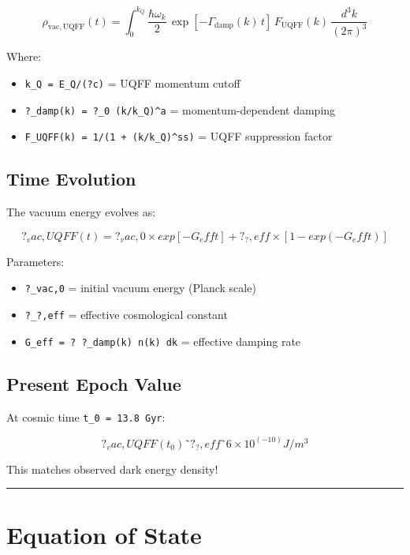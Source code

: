 \documentclass[12pt,a4paper]{article}
\begin{document}
\begin{equation}
\rho_{\mathrm{vac,UQFF}}(t) = \int_0^{k_Q} \frac{\hbar\omega_k}{2}\,\exp\!\left[-\Gamma_{\mathrm{damp}}(k)\,t\right]\,F_{\mathrm{UQFF}}(k)\,\frac{d^3k}{(2\pi)^3}
\end{equation}

Where:

\begin{itemize}
  \item \texttt{k\_Q = E\_Q/(?c)} = UQFF momentum cutoff
  \item \texttt{?\_damp(k) = ?\_0 (k/k\_Q)\^{}a} = momentum-dependent damping
  \item \texttt{F\_UQFF(k) = 1/(1 + (k/k\_Q)\^{}ss)} = UQFF suppression factor
\end{itemize}

\subsection{Time Evolution}

The vacuum energy evolves as:

\begin{equation}
?_vac,UQFF(t) = ?_vac,0 \times exp[-G_eff t] + ?_?,eff \times [1 - exp(-G_eff t)]
\end{equation}

Parameters:

\begin{itemize}
  \item \texttt{?\_vac,0} = initial vacuum energy (Planck scale)
  \item \texttt{?\_?,eff} = effective cosmological constant
  \item \texttt{G\_eff = ? ?\_damp(k) n(k) dk} = effective damping rate
\end{itemize}

\subsection{Present Epoch Value}

At cosmic time \texttt{t\_0 = 13.8 Gyr}:

\begin{equation}
?_vac,UQFF(t_0) ˜ ?_?,eff ˜ 6 \times 10^(-10) J/m^3
\end{equation}

This matches observed dark energy density!

\medskip\hrule\medskip

\section{Equation of State}
\end{document}
